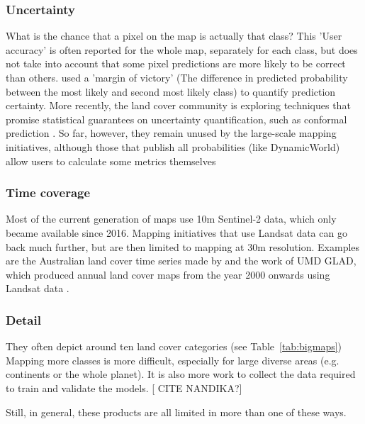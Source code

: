     \subsubsection{Uncertainty} 
        What is the chance that a pixel on the map is actually that class? This 'User accuracy' is often reported for the whole map, separately for each class, but does not take into account that some pixel predictions are more likely to be correct than others. \citet{calderon2021high} used a 'margin of victory' (The difference in predicted probability between the most likely and second most likely class) to quantify prediction certainty. More recently, the land cover community is exploring techniques that promise statistical guarantees on uncertainty quantification, such as conformal prediction \citep{angelopoulos2023predictionpowered,valle2023quantifying,singh2024uncertainty}. So far, however, they remain unused by the large-scale mapping initiatives, although those that publish all probabilities (like DynamicWorld) allow users to calculate some metrics themselves
    
    \subsubsection{Time coverage} 
        Most of the current generation of maps use 10m  Sentinel-2 data, which only became available since 2016. Mapping initiatives that use Landsat data can go back much further, but are then limited to mapping at 30m resolution. Examples are the Australian land cover time series made by \citep{calderon2021high} and the work of UMD GLAD, which produced annual land cover maps from the year 2000 onwards using Landsat data \citep{hansen2022global}.
    
    \subsubsection{Detail}
        They often depict around ten land cover categories (see Table~\ref{tab:bigmaps}) Mapping more classes is more difficult, especially for large diverse areas (e.g. continents or the whole planet). It is also more work to collect the data required to train and validate the models. [ CITE NANDIKA?]
    
    Still, in general, these products are all limited in more than one of these ways. 
    
